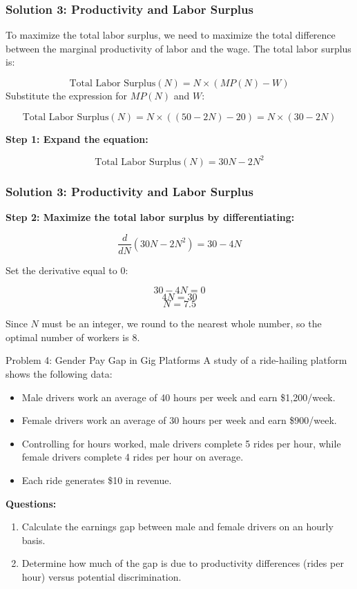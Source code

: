 \documentclass{beamer}
\begin{document}
\begin{frame}
\frametitle{Solution 3: Productivity and Labor Surplus}

To maximize the total labor surplus, we need to maximize the total difference between the marginal productivity of labor and the wage. The total labor surplus is:

\[
\text{Total Labor Surplus}(N) = N \times (MP(N) - W)
\]
Substitute the expression for \(MP(N)\) and \(W\):

\[
\text{Total Labor Surplus}(N) = N \times \left( (50 - 2N) - 20 \right) = N \times (30 - 2N)
\]

\textbf{Step 1: Expand the equation:}

\[
\text{Total Labor Surplus}(N) = 30N - 2N^2
\]


\end{frame}



\begin{frame}
\frametitle{Solution 3: Productivity and Labor Surplus}



\textbf{Step 2: Maximize the total labor surplus by differentiating:}

\[
\frac{d}{dN}(30N - 2N^2) = 30 - 4N
\]

Set the derivative equal to 0:

\[
30 - 4N = 0
\]
\[
4N = 30
\]
\[
N = 7.5
\]

Since \(N\) must be an integer, we round to the nearest whole number, so the optimal number of workers is \(\boxed{8}\).
\end{frame}





\begin{frame}{Problem 4: Gender Pay Gap in Gig Platforms}
    A study of a ride-hailing platform shows the following data:
    \begin{itemize}
        \item Male drivers work an average of 40 hours per week and earn \$1,200/week.
        \item Female drivers work an average of 30 hours per week and earn \$900/week.
        \item Controlling for hours worked, male drivers complete 5 rides per hour, while female drivers complete 4 rides per hour on average.
        \item Each ride generates \$10 in revenue.
    \end{itemize}
    \textbf{Questions:}
    \begin{enumerate}
        \item Calculate the earnings gap between male and female drivers on an hourly basis.
        \item Determine how much of the gap is due to productivity differences (rides per hour) versus potential discrimination.
    \end{enumerate}
\end{frame}
\end{document}
